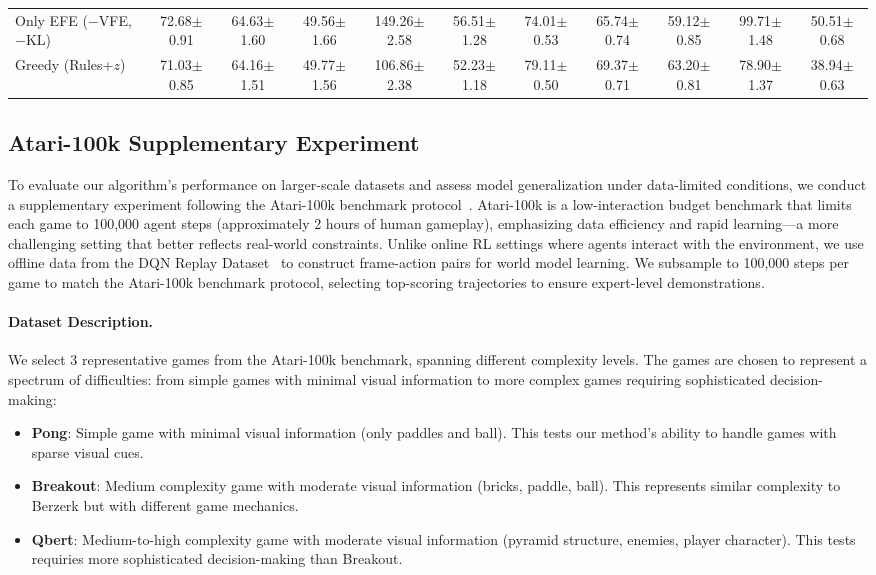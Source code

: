 \documentclass{article} %
\newcommand{\revise}[1]{#1}
\begin{document}
\begin{table}[!t]
{\begin{tabular}{lccccc|ccccc}
Only EFE ($-$VFE,$-$KL) & 72.68\revise{${\pm}$\tiny{0.91}} & 64.63\revise{${\pm}$\tiny{1.60}} & 49.56\revise{${\pm}$\tiny{1.66}} & 149.26\revise{${\pm}$\tiny{2.58}} & 56.51\revise{${\pm}$\tiny{1.28}} &
74.01\revise{${\pm}$\tiny{0.53}} & 65.74\revise{${\pm}$\tiny{0.74}} & 59.12\revise{${\pm}$\tiny{0.85}} & 99.71\revise{${\pm}$\tiny{1.48}} & 50.51\revise{${\pm}$\tiny{0.68}} \\
Greedy (Rules+$z$) & 71.03\revise{${\pm}$\tiny{0.85}} & 64.16\revise{${\pm}$\tiny{1.51}} & 49.77\revise{${\pm}$\tiny{1.56}} & 106.86\revise{${\pm}$\tiny{2.38}} & 52.23\revise{${\pm}$\tiny{1.18}} &
79.11\revise{${\pm}$\tiny{0.50}} & 69.37\revise{${\pm}$\tiny{0.71}} & 63.20\revise{${\pm}$\tiny{0.81}} & 78.90\revise{${\pm}$\tiny{1.37}} & 38.94\revise{${\pm}$\tiny{0.63}} \\
\bottomrule
\end{tabular}}
\end{table}
\revise{\subsection{Atari-100k Supplementary Experiment}
\label{Sec:C6}
To evaluate our algorithm's performance on larger-scale datasets and assess model generalization under data-limited conditions, we conduct a supplementary experiment following the Atari-100k benchmark protocol~\citep{kaiser2019modelbased}. Atari-100k is a low-interaction budget benchmark that limits each game to 100,000 agent steps (approximately 2 hours of human gameplay), emphasizing data efficiency and rapid learning---a more challenging setting that better reflects real-world constraints. Unlike online RL settings where agents interact with the environment, we use offline data from the DQN Replay Dataset~\citep{agarwal2020offline} to construct frame-action pairs for world model learning. We subsample to 100,000 steps per game to match the Atari-100k benchmark protocol, selecting top-scoring trajectories to ensure expert-level demonstrations.}
\revise{\paragraph{Dataset Description.}
We select 3 representative games from the Atari-100k benchmark, spanning different complexity levels. The games are chosen to represent a spectrum of difficulties: from simple games with minimal visual information to more complex games requiring sophisticated decision-making:}
\revise{\begin{itemize}
    \item \textbf{Pong}: Simple game with minimal visual information (only paddles and ball). This tests our method's ability to handle games with sparse visual cues.
    \item \textbf{Breakout}: Medium complexity game with moderate visual information (bricks, paddle, ball). This represents similar complexity to Berzerk but with different game mechanics.
    \item \textbf{Qbert}: Medium-to-high complexity game with moderate visual information (pyramid structure, enemies, player character). This tests requiries more sophisticated decision-making than Breakout.
\end{itemize}}
\end{document}
